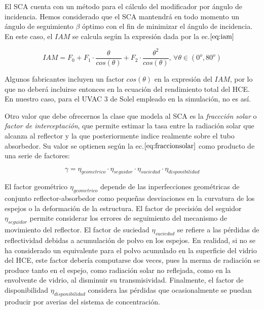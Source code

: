 \documentclass[11pt]{article}
\begin{document}
El SCA cuenta con un método para el cálculo del modificador por ángulo
de incidencia. Hemos considerado que el SCA mantendrá en todo momento un
ángulo de seguimiento \(\beta\) óptimo con el fin de minimizar el ángulo
de incidencia. En este caso, el \(IAM\) se calcula según la expresión
dada por la ec.\(\eqref{eq:iam}\)

\begin{equation}
   IAM = F_0 + F_1 \cdot \frac{\theta}{cos(\theta)} + F_2 \cdot \frac{\theta^2}{cos(\theta)},\, \forall   
 \theta \in (0^o, 80^o)
    \label{eq:iam}
\end{equation}

Algunos fabricantes incluyen un factor \(cos(\theta)\) en la expresión
del \(IAM\), por lo que no deberá incluirse entonces en la ecuación del
rendimiento total del HCE. En nuestro caso, para el UVAC 3 de Solel
empleado en la simulación, no es así.

Otro valor que debe ofrecernos la clase que modela al SCA es la
\emph{fraccción solar} o \emph{factor de interceptación}, que permite
estimar la tasa entre la radiación solar que alcanza al reflector y la
que posteriormente indice realmente sobre el tubo absorbedor. Su valor
se optienen según la ec.\(\eqref{eq:fraccionsolar}\) como producto de
una serie de factores:

\begin{equation}
   \gamma = \eta_{geometrico} \cdot \eta_{seguidor} \cdot \eta_{suciedad} \cdot \eta_{disponibilidad}
    \label{eq:fraccionsolar}
\end{equation}

El factor geométrico \(\eta_{geometrico}\) depende de las inperfecciones
geométricas de conjunto reflector-absorbedor como pequeñas desviaciones
en la curvatura de los espejos o la deformación de la estructura. El
factor de precisión del seguidor \(\eta_{seguidor}\) permite considerar
los errores de seguimiento del mecanismo de movimiento del reflector. El
factor de suciedad \(\eta_{suciedad}\) se refiere a las pérdidas de
reflectividad debidas a acumulación de polvo en los espejos. En
realidad, si no se ha considerado un equivalente para el polvo acumulado
en la superficie del vidrio del HCE, este factor debería computarse dos
veces, pues la merma de radiación se produce tanto en el espejo, como
radiación solar no reflejada, como en la envolvente de vidrio, al
disminuir su transmisividad. Finalmente, el factor de disponibilidad
\(\eta_{disponibilidad}\) considera las pérdidas que ocasionalmente se
puedan producir por averias del sistema de concentración.
\end{document}
